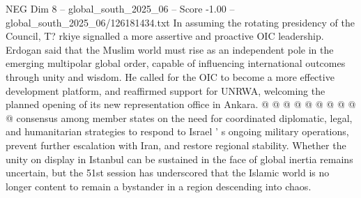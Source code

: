 \begin{textsample}{NEG Dim 8 – global\_south\_2025\_06 – Score -1.00 – global\_south\_2025\_06/126181434.txt}
In assuming the rotating presidency of the Council, T? rkiye signalled a more assertive and proactive OIC leadership.
Erdogan said that the Muslim world must rise as an independent pole in the emerging multipolar global order, capable of influencing international outcomes through unity and wisdom.
He called for the OIC to become a more effective development platform, and reaffirmed support for UNRWA, welcoming the planned opening of its new representation office in Ankara. @ @ @ @ @ @ @ @ @ @ consensus among member states on the need for coordinated diplomatic, legal, and humanitarian strategies to respond to Israel ' s ongoing military operations, prevent further escalation with Iran, and restore regional stability.
Whether the unity on display in Istanbul can be sustained in the face of global inertia remains uncertain, but the 51st session has underscored that the Islamic world is no longer content to remain a bystander in a region descending into chaos.

\end{textsample}
